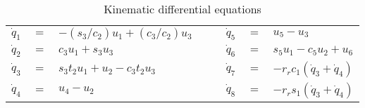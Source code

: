 \documentclass[letterpaper,11pt]{article}
\begin{document}
\begin{table}[!h]
  \begin{center}
    \begin{tabular}{rclcrcl}
        $\dot{q}_1$ & $=$ & $-(s_3/c_2) u_1 + (c_3/c_2) u_3$ &$\quad$&
        $\dot{q}_5$ & $=$ & $u_5 - u_3$ \\
        $\dot{q}_2$ & $=$ & $c_3 u_1 + s_3 u_3$ &$\quad$&
        $\dot{q}_6$ & $=$ & $s_5 u_1 - c_5 u_2 + u_6$ \\
        $\dot{q}_3$ & $=$ & $s_3 t_2 u_1 + u_2 - c_3 t_2 u_3$ &$\quad$&
        $\dot{q}_7$ & $=$ & $-r_r c_1 (\dot{q}_3 + \dot{q}_4)$ \\
        $\dot{q}_4$ & $=$ & $u_4 - u_2$ & $\quad$ &
        $\dot{q}_8$ & $=$ & $-r_r s_1 (\dot{q}_3 + \dot{q}_4)$
    \end{tabular}
  \end{center}
  \caption{Kinematic differential equations}
  \label{kindiffs}
\end{table}



\end{document}
